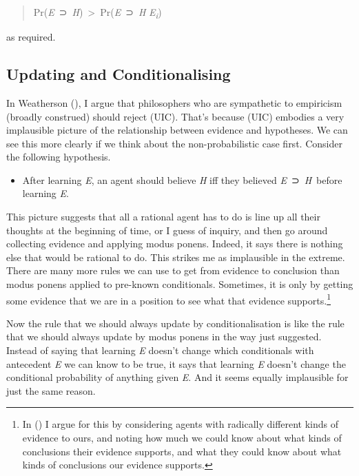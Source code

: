 \documentclass[
  10pt,
  letterpaper,
  DIV=11,
  numbers=noendperiod,
  twoside]{scrartcl}
\providecommand{\tightlist}{%
  \setlength{\itemsep}{0pt}\setlength{\parskip}{0pt}}\usepackage{longtable,booktabs,array}
\begin{document}
\begin{quote}
Pr(\emph{E}~⊃~\emph{H})~\textgreater~Pr(\emph{E}~⊃~\emph{H}\textbar{}
\emph{E\textsubscript{i}})
\end{quote}

as required.

\subsection{Updating and
Conditionalising}\label{updating-and-conditionalising}

In Weatherson (), I argue that
philosophers who are sympathetic to empiricism (broadly construed)
should reject (UIC). That's because (UIC) embodies a very implausible
picture of the relationship between evidence and hypotheses. We can see
this more clearly if we think about the non-probabilistic case first.
Consider the following hypothesis.

\begin{itemize}
\tightlist
\item
  After learning \emph{E}, an agent should believe \emph{H} iff they
  believed \emph{E}~⊃~\emph{H}~before learning \emph{E}.
\end{itemize}

This picture suggests that all a rational agent has to do is line up all
their thoughts at the beginning of time, or I guess of inquiry, and then
go around collecting evidence and applying modus ponens. Indeed, it says
there is nothing else that would be rational to do. This strikes me as
implausible in the extreme. There are many more rules we can use to get
from evidence to conclusion than modus ponens applied to pre-known
conditionals. Sometimes, it is only by getting some evidence that we are
in a position to see what that evidence supports.\footnote{In
  () I argue for this by
  considering agents with radically different kinds of evidence to ours,
  and noting how much we could know about what kinds of conclusions
  their evidence supports, and what they could know about what kinds of
  conclusions our evidence supports.}

Now the rule that we should always update by conditionalisation is like
the rule that we should always update by modus ponens in the way just
suggested. Instead of saying that learning \emph{E} doesn't change which
conditionals with antecedent \emph{E} we can know to be true, it says
that learning \emph{E} doesn't change the conditional probability of
anything given \emph{E}. And it seems equally implausible for just the
same reason.
\end{document}
